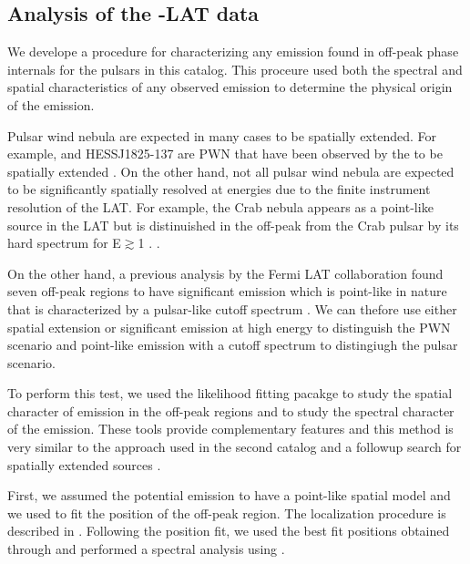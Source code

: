 \subsection{Analysis of the \fermi-LAT data}
\label{subsec:analysis_off_peak}

We develope a procedure for characterizing any emission found
in off-peak phase internals for the pulsars in this catalog.  
This proceure used both the spectral and spatial characteristics
of any observed emission to determine the physical origin of the emission.

Pulsar wind nebula are expected in many cases to be spatially
extended. For example, \velax and HESS\;J1825-137 are PWN
that have been observed by the \lat to be spatially extended
\citep{LAT_collaboration_Vela_X_2010,LAT_collaboration_HESS_J1825_2011}.
On the other hand, not all pulsar wind nebula are expected to be
significantly spatially resolved at \gev energies due to the finite
instrument resolution of the LAT. For example, the Crab nebula appears
as a point-like source in the LAT but is distinuished in the off-peak
from the Crab pulsar by its hard spectrum for E$\gtrsim$1 \gev.
\citep{LAT_collaboration_crab_2010}.

On the other hand, a previous analysis by the Fermi LAT collaboration
found seven off-peak regions to have significant emission which is
point-like in nature that is characterized by a pulsar-like cutoff
spectrum \citep{LAT_collaboration_PWNCAT_2011}.  We can thefore use
either spatial extension or significant emission at high energy to
distinguish the PWN scenario and point-like emission with a cutoff
spectrum to distingiugh the pulsar scenario.

To perform this test, we used the likelihood fitting pacakge \pointlike to study
the spatial character of emission in the off-peak regions and \gtlike to
study the spectral character of the emission. These tools provide complementary
features and this method is very similar to the approach used in the
second \lat catalog \citep{LAT_Collaboration_2FGL_2012}
and a followup search for spatially extended sources 
\citep{LAT_collaboration_extended_search_2012}.

First, we assumed the potential emission to have a point-like spatial model
and we used \pointlike to fit the position of 
the off-peak region. The localization procedure is described in \cite{LAT_Collaboration_2FGL_2012}. 
Following the position fit, we used the best fit positions
obtained through \pointlike and performed a spectral analysis using \gtlike.

